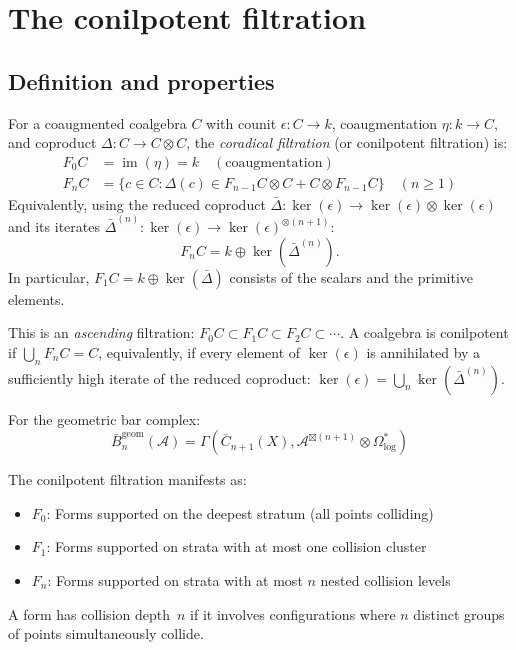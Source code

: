 \section{The conilpotent filtration}

\subsection{Definition and properties}

\begin{definition}\label{def:conilpotent-filtration}
For a coaugmented coalgebra $C$ with counit $\epsilon: C \to k$, coaugmentation $\eta: k \to C$, and coproduct $\Delta: C \to C \otimes C$, the \emph{coradical filtration} (or conilpotent filtration) is:
\begin{align*}
F_0C &= \operatorname{im}(\eta) = k \quad (\text{coaugmentation}) \\
F_nC &= \{c \in C : \Delta(c) \in F_{n-1}C \otimes C + C \otimes F_{n-1}C\} \quad (n \geq 1)
\end{align*}
Equivalently, using the reduced coproduct $\bar{\Delta}: \ker(\epsilon) \to \ker(\epsilon) \otimes \ker(\epsilon)$ and its iterates $\bar{\Delta}^{(n)}: \ker(\epsilon) \to \ker(\epsilon)^{\otimes(n+1)}$:
\[
F_nC = k \oplus \ker(\bar{\Delta}^{(n)}).
\]
In particular, $F_1C = k \oplus \ker(\bar{\Delta})$ consists of the scalars and the primitive elements.

This is an \emph{ascending} filtration: $F_0C \subset F_1C \subset F_2C \subset \cdots$.
A coalgebra is conilpotent if $\bigcup_n F_nC = C$, equivalently, if every element of $\ker(\epsilon)$ is annihilated by a sufficiently high iterate of the reduced coproduct: $\ker(\epsilon) = \bigcup_n \ker(\bar{\Delta}^{(n)})$.
\end{definition}

\begin{proposition}\label{prop:geom-conilpotent}
For the geometric bar complex:
\[\bar{B}^{\mathrm{geom}}_n(\mathcal{A}) = \Gamma(\overline{C}_{n+1}(X), \mathcal{A}^{\boxtimes(n+1)} \otimes \Omega^*_{\log})\]

The conilpotent filtration manifests as:
\begin{itemize}
\item $F_0$: Forms supported on the deepest stratum (all points colliding)
\item $F_1$: Forms supported on strata with at most one collision cluster
\item $F_n$: Forms supported on strata with at most $n$ nested collision levels
\end{itemize}

A form has collision depth~$n$ if it involves configurations where $n$ distinct groups of points simultaneously collide.
\end{proposition}

